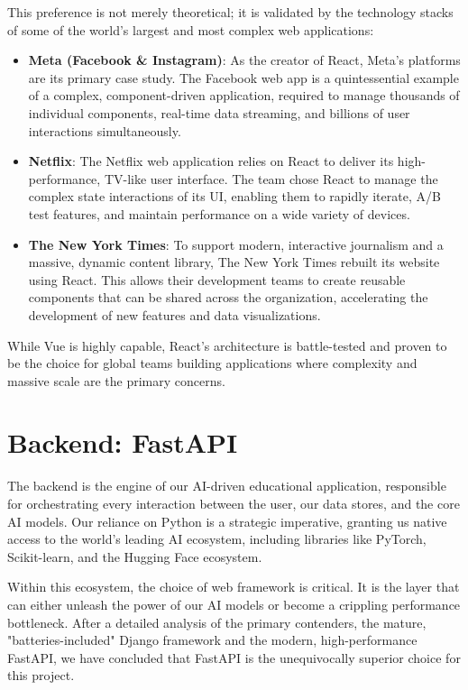 This preference is not merely theoretical; it is validated by the technology stacks of some of the world's largest and most complex web applications:
\begin{itemize}
    \item \textbf{Meta (Facebook \& Instagram)}: As the creator of React, Meta's platforms are its primary case study. The Facebook web app is a quintessential example of a complex, component-driven application, required to manage thousands of individual components, real-time data streaming, and billions of user interactions simultaneously.
    \item \textbf{Netflix}: The Netflix web application relies on React to deliver its high-performance, TV-like user interface. The team chose React to manage the complex state interactions of its UI, enabling them to rapidly iterate, A/B test features, and maintain performance on a wide variety of devices.
    \item \textbf{The New York Times}: To support modern, interactive journalism and a massive, dynamic content library, The New York Times rebuilt its website using React. This allows their development teams to create reusable components that can be shared across the organization, accelerating the development of new features and data visualizations.
\end{itemize}

While Vue is highly capable, React's architecture is battle-tested and proven to be the choice for global teams building applications where complexity and massive scale are the primary concerns.

\section{Backend: FastAPI}


The backend is the engine of our AI-driven educational application, responsible for orchestrating every interaction between the user, our data stores, and the core AI models. Our reliance on Python is a strategic imperative, granting us native access to the world's leading AI ecosystem, including libraries like PyTorch, Scikit-learn, and the Hugging Face ecosystem.

Within this ecosystem, the choice of web framework is critical. It is the layer that can either unleash the power of our AI models or become a crippling performance bottleneck. After a detailed analysis of the primary contenders, the mature, "batteries-included" Django framework and the modern, high-performance FastAPI, we have concluded that FastAPI is the unequivocally superior choice for this project.

